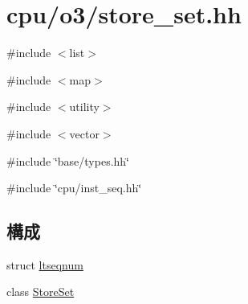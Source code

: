\hypertarget{store__set_8hh}{
\section{cpu/o3/store\_\-set.hh}
\label{store__set_8hh}
}
{\ttfamily \#include $<$list$>$}\par
{\ttfamily \#include $<$map$>$}\par
{\ttfamily \#include $<$utility$>$}\par
{\ttfamily \#include $<$vector$>$}\par
{\ttfamily \#include \char`\"{}base/types.hh\char`\"{}}\par
{\ttfamily \#include \char`\"{}cpu/inst\_\-seq.hh\char`\"{}}\par
\subsection*{構成}
\begin{DoxyCompactItemize}
\item 
struct \hyperlink{structltseqnum}{ltseqnum}
\item 
class \hyperlink{classStoreSet}{StoreSet}
\end{DoxyCompactItemize}

